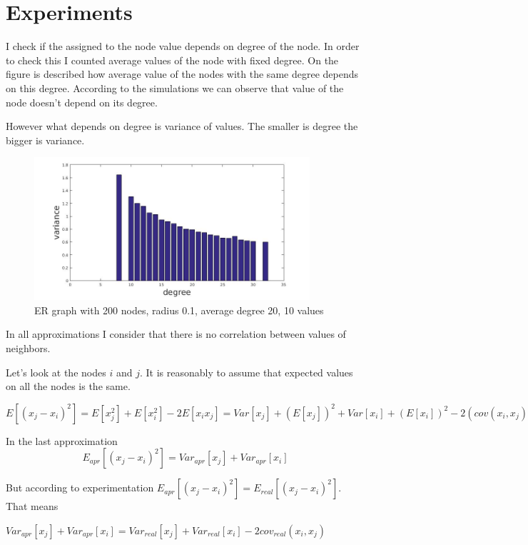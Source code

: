 \documentclass[12pt]{report}
\begin{document}
\section{Experiments}

I check if the assigned to the node value depends on degree of the node. In order to check this I counted average values of the node with fixed degree.
On the figure is described how average value of the nodes with the same degree depends on this degree. According to the simulations we can observe that value of the node doesn't depend on its degree.

However what depends on degree is variance of values. The smaller is degree the bigger is variance.


\begin{figure}[ht]
    \centering
    \includegraphics[height=200px]{degreeVar}
    \caption{ ER graph with 200 nodes, radius 0.1, average degree 20, 10 values}
\end{figure}


In all approximations I consider that there is no correlation between values of neighbors.

Let's look at the nodes $i$ and $j$. It is reasonably to assume that expected values on all the nodes is the same.


$E[(x_j-x_i)^2] = E[x_j^2] + E[x_i^2] - 2E[x_ix_j] = Var[x_j] + (E[x_j])^2 + Var[x_i] + (E[x_i])^2 - 2(cov(x_i, x_j) + E[x_i]E[x_j]) = Var[x_j] + Var[x_i] - 2cov(x_i, x_j)$


In the last approximation
$$E_{apr}[(x_j-x_i)^2] = Var_{apr}[x_j] + Var_{apr}[x_i]$$

But according to experimentation $E_{apr}[(x_j-x_i)^2] = E_{real}[(x_j-x_i)^2]$. That means

$Var_{apr}[x_j] + Var_{apr}[x_i] = Var_{real}[x_j] + Var_{real}[x_i] - 2cov_{real}(x_i, x_j)$
\end{document}
